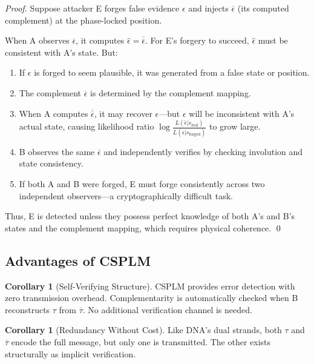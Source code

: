 \documentclass[11pt,a4paper]{article}
\theoremstyle{definition}
\newtheorem{corollary}[definition]{Corollary}
\newcommand{\comp}[1]{\overline{#1}}
\begin{document}
\begin{proof}
Suppose attacker E forges false evidence $\epsilon$ and injects $\comp{\epsilon}$ (its computed complement) at the phase-locked position.

When A observes $\comp{\epsilon}$, it computes $\hat{\epsilon} = \comp{\comp{\epsilon}}$. For E's forgery to succeed, $\hat{\epsilon}$ must be consistent with A's state. But:

\begin{enumerate}
\item If $\epsilon$ is forged to seem plausible, it was generated from a false state or position.
\item The complement $\comp{\epsilon}$ is determined by the complement mapping.
\item When A computes $\comp{\comp{\epsilon}}$, it may recover $\epsilon$—but $\epsilon$ will be inconsistent with A's actual state, causing likelihood ratio $\log \frac{L(\hat{\epsilon} | s_{\text{real}})}{L(\hat{\epsilon} | s_{\text{forged}})}$ to grow large.
\item B observes the same $\comp{\epsilon}$ and independently verifies by checking involution and state consistency.
\item If both A and B were forged, E must forge consistently across two independent observers—a cryptographically difficult task.
\end{enumerate}

Thus, E is detected unless they possess perfect knowledge of both A's and B's states and the complement mapping, which requires physical coherence. \qed
\end{proof}

\subsection{Advantages of CSPLM}

\begin{corollary}[Self-Verifying Structure]
CSPLM provides error detection with zero transmission overhead. Complementarity is automatically checked when B reconstructs $\tau$ from $\comp{\tau}$. No additional verification channel is needed.
\end{corollary}

\begin{corollary}[Redundancy Without Cost]
Like DNA's dual strands, both $\tau$ and $\comp{\tau}$ encode the full message, but only one is transmitted. The other exists structurally as implicit verification.
\end{corollary}
\end{document}
